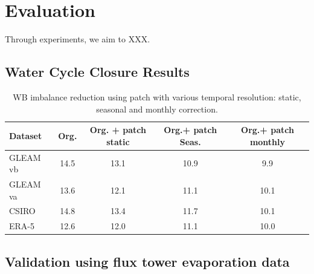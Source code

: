 \documentclass[draft]{agujournal2019}
\begin{document}
\section{Evaluation}

Through experiments, we aim to XXX.

\subsection{Water Cycle Closure Results}

\begin{table}[h]
\centering
\begin{scriptsize}
\begin{tabular} {l c c c c}
\hline
Dataset & Org. &   Org. + patch static &  Org.+ patch Seas. &  Org.+ patch monthly \\
\hline 
GLEAM vb &  14.5    &   13.1     &  10.9     &  9.9    \\
GLEAM va &   13.6   &    12.1   &  11.1     &  10.1    \\
CSIRO &   14.8   &   13.4     &   11.7    &    10.1  \\
ERA-5 &   12.6   &    12.0    &   11.1    &   10.0   \\
\hline
\end{tabular}
\end{scriptsize}
\caption{WB imbalance reduction using patch with various temporal resolution: static, seasonal and monthly correction. }
\label{table1}
\end{table}

\subsection{Validation using flux tower evaporation data}
\end{document}
